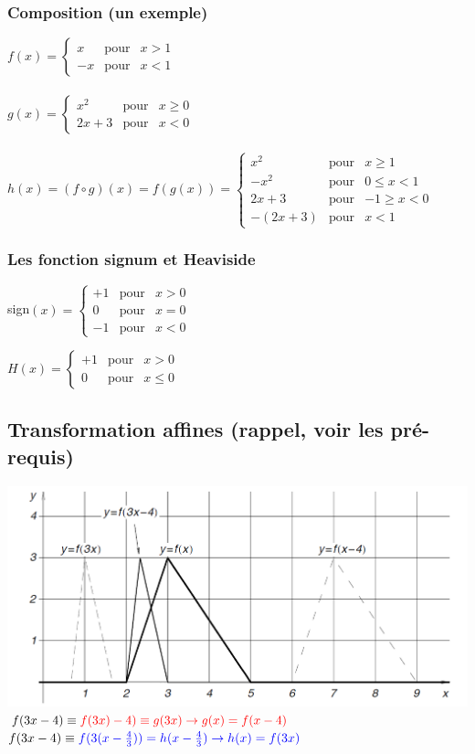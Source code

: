 \documentclass[12pt,a4paper]{article}
\begin{document}
{\subsubsection{Composition (un exemple)}
$f(x)=
\left\{
	\begin{array}{lll}
	x & \mbox{pour} & x > 1\\
	-x & \mbox{pour} &  x<1
	\end{array}
\right.
$\\
\\
$g(x)=
\left\{
	\begin{array}{lll}
	x^2 & \mbox{pour} & x \geq 0\\
	2x+3 & \mbox{pour} &  x<0
	\end{array}
\right.
$\\
\\
$h(x)= (f\circ g)(x) = f(g(x)) =
\left\{
	\begin{array}{cll}
	x^2 & \mbox{pour} & x \geq 1\\
	-x^2 & \mbox{pour} &  0 \leq x < 1\\
	2x+3 & \mbox{pour} & -1 \geq x < 0\\
	-(2x+3) & \mbox{pour} & x < 1
	\end{array}
\right.
$

\subsubsection{Les fonction signum et Heaviside}
sign$(x)=
\left\{
	\begin{array}{lll}
	+1 & \mbox{pour} & x > 0\\
	0 & \mbox{pour} & x = 0\\
	-1& \mbox{pour} & x < 0
	\end{array}
\right.$

$H(x)=
\left\{
	\begin{array}{lll}
	+1 & \mbox{pour} & x > 0\\
	0 & \mbox{pour} & x \leq 0
	\end{array}
\right.$
\subsection{Transformation affines (rappel, voir les pré-requis)}
\includegraphics[scale=0.3]{illustrations_Analyse/Affine}\\
$f(3x-4)\equiv \textcolor{red}{f(3x)-4) \equiv g(3x) \to g(x) = f(x-4)}$\\
$f(3x-4) \equiv \textcolor{blue}{f(3(x-\frac{4}{3})) = h(x-\frac{4}{3}) \to h(x) = f(3x)}$
}
\end{document}
